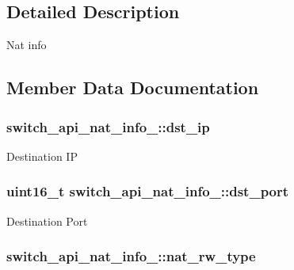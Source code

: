 \subsection{Detailed Description}
Nat info 

\subsection{Member Data Documentation}
\hypertarget{structswitch__api__nat__info___af4d9fa88f2f1d72451649d6685c01736}{
\subsubsection[{dst\+\_\+ip}]{ switch\+\_\+api\+\_\+nat\+\_\+info\+\_\+\+::dst\+\_\+ip}}\label{structswitch__api__nat__info___af4d9fa88f2f1d72451649d6685c01736}
Destination I\+P \hypertarget{structswitch__api__nat__info___ae455b86c6301d9ef14118555954a39e7}{
\subsubsection[{dst\+\_\+port}]{\setlength{\rightskip}{0pt plus 5cm}uint16\+\_\+t switch\+\_\+api\+\_\+nat\+\_\+info\+\_\+\+::dst\+\_\+port}}\label{structswitch__api__nat__info___ae455b86c6301d9ef14118555954a39e7}
Destination Port \hypertarget{structswitch__api__nat__info___a2cbe0f6d24fe512ab4d27fbe6b3d5332}{
\subsubsection[{nat\+\_\+rw\+\_\+type}]{ switch\+\_\+api\+\_\+nat\+\_\+info\+\_\+\+::nat\+\_\+rw\+\_\+type}}\label{structswitch__api__nat__info___a2cbe0f6d24fe512ab4d27fbe6b3d5332}
